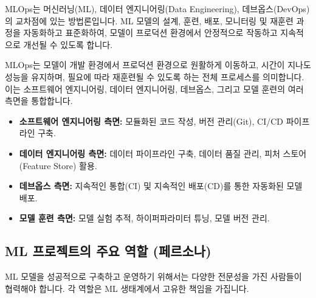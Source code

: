 \documentclass[11pt,a4paper]{article}
\begin{document}
\begin{summarybox}
MLOps는 머신러닝(ML), 데이터 엔지니어링(Data Engineering), 데브옵스(DevOps)의 교차점에 있는 방법론입니다. ML 모델의 설계, 훈련, 배포, 모니터링 및 재훈련 과정을 자동화하고 표준화하여, 모델이 프로덕션 환경에서 안정적으로 작동하고 지속적으로 개선될 수 있도록 합니다.
\end{summarybox}

MLOps는 모델이 개발 환경에서 프로덕션 환경으로 원활하게 이동하고, 시간이 지나도 성능을 유지하며, 필요에 따라 재훈련될 수 있도록 하는 전체 프로세스를 의미합니다. 이는 소프트웨어 엔지니어링, 데이터 엔지니어링, 데브옵스, 그리고 모델 훈련의 여러 측면을 통합합니다.

\begin{itemize}
    \item \textbf{소프트웨어 엔지니어링 측면:} 모듈화된 코드 작성, 버전 관리(Git), CI/CD 파이프라인 구축.
    \item \textbf{데이터 엔지니어링 측면:} 데이터 파이프라인 구축, 데이터 품질 관리, 피처 스토어(Feature Store) 활용.
    \item \textbf{데브옵스 측면:} 지속적인 통합(CI) 및 지속적인 배포(CD)를 통한 자동화된 모델 배포.
    \item \textbf{모델 훈련 측면:} 모델 실험 추적, 하이퍼파라미터 튜닝, 모델 버전 관리.
\end{itemize}

\subsection{ML 프로젝트의 주요 역할 (페르소나)}

ML 모델을 성공적으로 구축하고 운영하기 위해서는 다양한 전문성을 가진 사람들이 협력해야 합니다. 각 역할은 ML 생태계에서 고유한 책임을 가집니다.
\end{document}

